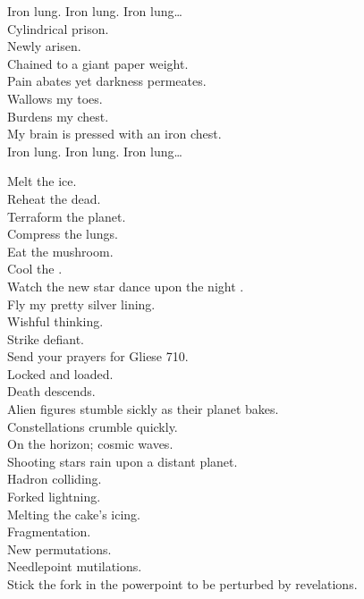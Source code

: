 Iron lung. Iron lung. Iron lung… \\

Cylindrical prison. \\
Newly arisen. \\
Chained to a giant paper weight. \\
Pain abates yet darkness permeates. \\
Wallows my toes. \\
Burdens my chest. \\
My brain is pressed with an iron chest. \\

Iron lung. Iron lung. Iron lung… \\




Melt the ice. \\
Reheat the dead. \\
Terraform the planet. \\
Compress the lungs. \\
Eat the mushroom. \\
Cool the . \\
Watch the new star dance upon the night . \\
Fly my pretty silver lining. \\
Wishful thinking. \\
Strike defiant. \\
Send your prayers for Gliese 710. \\
Locked and loaded. \\
Death descends. \\

Alien figures stumble sickly as their planet bakes. \\
Constellations crumble quickly. \\
On the horizon; cosmic waves. \\
Shooting stars rain upon a distant planet. \\
Hadron colliding. \\
Forked lightning. \\
Melting the cake's icing. \\

Fragmentation. \\
New permutations. \\
Needlepoint mutilations. \\
Stick the fork in the powerpoint to be perturbed by revelations. \\

